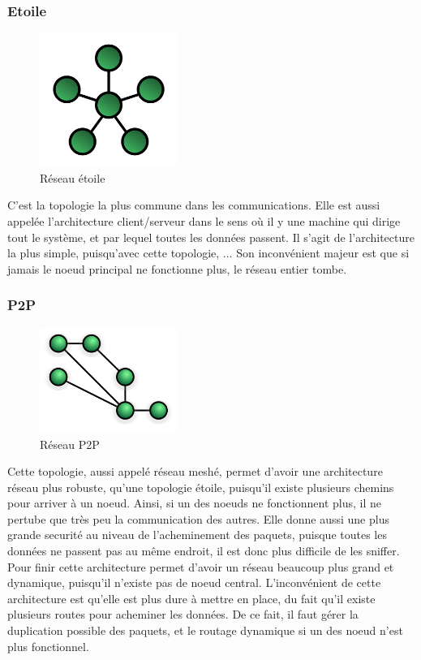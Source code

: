 	    \subsubsection{Etoile}
\begin{figure}[!ht]
         \centering
         \includegraphics[width=0.4\textwidth]{img/StarNetwork.png}
         \caption{Réseau étoile}
         \label{StarNetwork}
\end{figure}
C'est la topologie la plus commune dans les communications. Elle est aussi appelée l'architecture 
client/serveur dans le sens où il y une machine qui dirige tout le système, et par lequel toutes les données 
passent. Il s'agit de l'architecture la plus simple, puisqu'avec cette topologie,  ... Son inconvénient 
majeur est que si jamais le noeud principal ne fonctionne plus, le réseau entier tombe.

	    \subsubsection{P2P}
\begin{figure}[!ht]
         \centering
         \includegraphics[width=0.4\textwidth]{img/NetworkTopology-Mesh.png}
         \caption{Réseau P2P}
         \label{MeshNetwork}
\end{figure}
Cette topologie, aussi appelé réseau meshé, permet d'avoir une architecture réseau plus robuste, qu'une 
topologie étoile, puisqu'il existe plusieurs chemins pour arriver à un noeud. Ainsi, si un des noeuds ne 
fonctionnent plus, il ne pertube que très peu la communication des autres. Elle donne aussi une plus grande 
securité au niveau de l'acheminement des paquets, puisque toutes les données ne passent pas au même endroit, 
il est donc plus difficile de les sniffer. Pour finir cette architecture permet d'avoir un réseau beaucoup 
plus grand et dynamique, puisqu'il n'existe pas de noeud central. L'inconvénient de cette architecture est 
qu'elle est plus dure à mettre en place, du fait qu'il existe plusieurs routes pour acheminer les données. 
De ce fait, il faut gérer la duplication possible des paquets, et le routage dynamique si un des noeud n'est 
plus 
fonctionnel.

